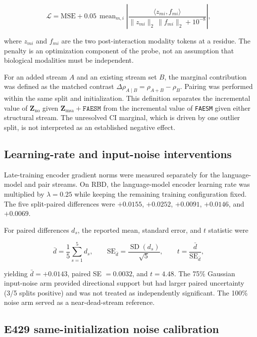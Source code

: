 \documentclass[10pt,a4paper]{article}
\newcommand{\Zno}{\mathbf{Z}_{\mathrm{no}}}
\newcommand{\Zmsa}{\mathbf{Z}_{\mathrm{msa}}}
\newcommand{\FAESM}{\texttt{FAESM}}
\begin{document}
\begin{equation}
\mathcal{L}=\mathrm{MSE}+0.05\,\operatorname{mean}_{m,i}
\left|\frac{\langle z_{mi},f_{mi}\rangle}
{\lVert z_{mi}\rVert_2\,\lVert f_{mi}\rVert_2+10^{-8}}\right|,
\end{equation}

where $z_{mi}$ and $f_{mi}$ are the two post-interaction modality tokens at a residue. The penalty is an optimization component of the probe, not an assumption that biological modalities must be independent.

For an added stream $A$ and an existing stream set $B$, the marginal contribution was defined as the matched contrast $\Delta\rho_{A\mid B}=\rho_{A+B}-\rho_B$. Pairing was performed within the same split and initialization. This definition separates the incremental value of $\Zno$ given $\Zmsa+\FAESM$ from the incremental value of \FAESM{} given either structural stream. The unresolved CI marginal, which is driven by one outlier split, is not interpreted as an established negative effect.

\subsection{Learning-rate and input-noise interventions}

Late-training encoder gradient norms were measured separately for the language-model and pair streams. On RBD, the language-model encoder learning rate was multiplied by $\lambda=0.25$ while keeping the remaining training configuration fixed. The five split-paired differences were $+0.0155$, $+0.0252$, $+0.0091$, $+0.0146$, and $+0.0069$.

For paired differences $d_s$, the reported mean, standard error, and $t$ statistic were

\begin{equation}
\bar d=\frac{1}{5}\sum_{s=1}^{5}d_s,\qquad
\mathrm{SE}_{\bar d}=\frac{\operatorname{SD}(d_s)}{\sqrt{5}},\qquad
t=\frac{\bar d}{\mathrm{SE}_{\bar d}},
\end{equation}

yielding $\bar d=+0.0143$, paired SE $=0.0032$, and $t=4.48$. The 75\% Gaussian input-noise arm provided directional support but had larger paired uncertainty (3/5 splits positive) and was not treated as independently significant. The 100\% noise arm served as a near-dead-stream reference.

\subsection{E429 same-initialization noise calibration}
\end{document}
